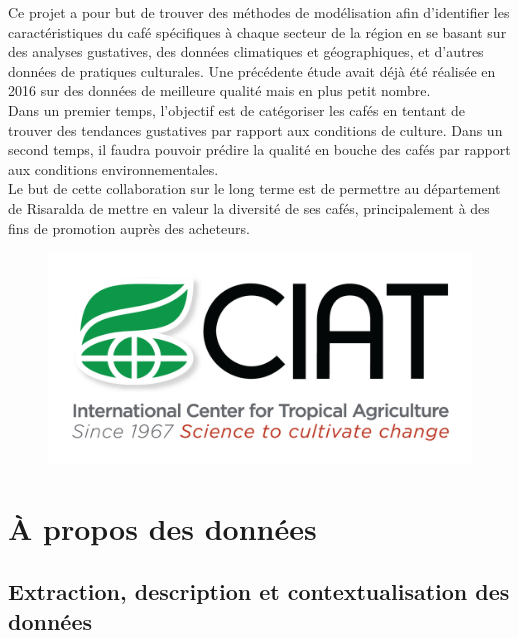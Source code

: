 \noindent Ce projet a pour but de trouver des méthodes de modélisation afin d’identifier les caractéristiques du café spécifiques à chaque secteur de la région en se basant sur des analyses gustatives, des données climatiques et géographiques, et d’autres données de pratiques culturales. Une précédente étude avait déjà été réalisée en 2016 sur des données de meilleure qualité mais en plus petit nombre.\cite{Cenicafe}\\


\noindent Dans un premier temps, l’objectif est de catégoriser les cafés en tentant de trouver des tendances gustatives par rapport aux conditions de culture. Dans un second temps, il faudra pouvoir prédire la qualité en bouche des cafés par rapport aux conditions environnementales.\\


\noindent Le but de cette collaboration sur le long terme est de permettre au département de Risaralda de mettre en valeur la diversité de ses cafés, principalement à des fins de promotion auprès des acheteurs. \\



\begin{figure}
	\centering
	\includegraphics[width=0.7\linewidth]{img/CIAT_logo_light_PNG/CIAT-Logo-1275x640}
	
	\label{fig:ciat-logo-1275x640}
\end{figure}


\chapter{À propos des données}

\section{Extraction, description et contextualisation des données}

